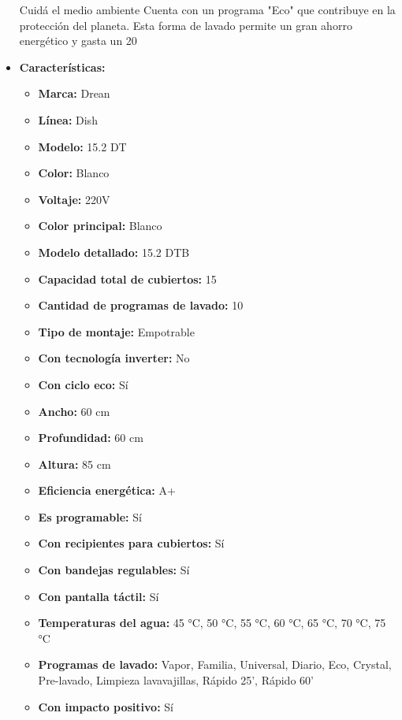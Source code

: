 \documentclass{article}
\begin{document}
\begin{adjustwidth}{2em}{}
\begin{itemize}
Cuidá el medio ambiente
Cuenta con un programa "Eco" que contribuye en la protección del planeta. Esta forma de lavado permite un gran ahorro energético y gasta un 20%
    \item \textbf{Características:} 
    \begin{itemize}
        \item \textbf {Marca:} Drean
    \item \textbf {Línea:} Dish
    \item \textbf {Modelo:} 15.2 DT
    \item \textbf {Color:} Blanco
    \item \textbf {Voltaje:} 220V
    \item \textbf {Color principal:} Blanco
    \item \textbf {Modelo detallado:} 15.2 DTB
    \item \textbf {Capacidad total de cubiertos:} 15
    \item \textbf {Cantidad de programas de lavado:} 10
    \item \textbf {Tipo de montaje:} Empotrable
    \item \textbf {Con tecnología inverter:} No
    \item \textbf {Con ciclo eco:} Sí
    \item \textbf {Ancho:} 60 cm
    \item \textbf {Profundidad:} 60 cm
    \item \textbf {Altura:} 85 cm
    \item \textbf {Eficiencia energética:} A+
    \item \textbf {Es programable:} Sí
    \item \textbf {Con recipientes para cubiertos:} Sí
    \item \textbf {Con bandejas regulables:} Sí
    \item \textbf {Con pantalla táctil:} Sí
    \item \textbf {Temperaturas del agua:} 45 °C, 50 °C, 55 °C, 60 °C, 65 °C, 70 °C, 75 °C
    \item \textbf {Programas de lavado:} Vapor, Familia, Universal, Diario, Eco, Crystal, Pre-lavado, Limpieza lavavajillas, Rápido 25', Rápido 60'
    \item \textbf {Con impacto positivo:} Sí
    \end{itemize}
\end{itemize}

\vspace{1\baselineskip} %
\end{adjustwidth}
\end{document}
